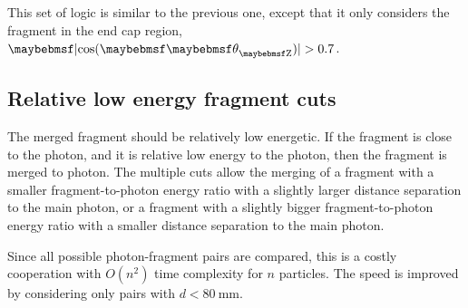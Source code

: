 This set of logic is similar to the previous one, except that it only considers the fragment in the end cap region,  $\absCosTheta > 0.7$.

\subsection{Relative low energy fragment cuts}

The merged fragment should be relatively low energetic.  If the fragment is close to the photon, and it is relative low energy to the photon, then the fragment is merged to photon. The multiple cuts allow the merging of a fragment with a smaller fragment-to-photon energy ratio with a slightly larger distance separation to the main photon, or a fragment with a slightly bigger  fragment-to-photon energy ratio with a smaller distance separation to the main photon.







Since all possible photon-fragment pairs are compared, this is a costly cooperation with $O(n^2)$ time complexity for $n$ particles. The speed is improved by considering only pairs with $d<80\ \text{mm}$.


